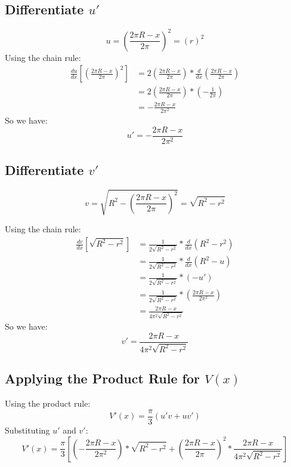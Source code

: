 \documentclass{article}
\begin{document}
\subsection{Differentiate \( u' \)}
\begin{displaymath}
    u = \left(\frac{2\pi R - x}{2\pi}\right)^2 = (r)^2
\end{displaymath}
Using the chain rule:
\begin{align*}
    \frac{du}{dx}\left[\left(\frac{2\pi R - x}{2\pi}\right)^2\right] &= 2\left(\frac{2\pi R - x}{2\pi}\right) * \frac{d}{dx}\left(\frac{2\pi R - x}{2\pi}\right) \\
    &= 2\left(\frac{2\pi R - x}{2\pi}\right) * \left(-\frac{1}{2\pi}\right) \\
    &= -\frac{2\pi R - x}{2\pi^2}
\end{align*}
So we have:
\begin{displaymath}
    u' = -\frac{2\pi R - x}{2\pi^2}
\end{displaymath}


\subsection{Differentiate \( v' \)}
\begin{displaymath}
    v = \sqrt{R^2 - \left(\frac{2\pi R - x}{2\pi}\right)^2} = \sqrt{R^2 - r^2}
\end{displaymath}

\noindent Using the chain rule:
\begin{align*}
    \frac{dv}{dx}\left[\sqrt{R^2 - r^2}\right] 
    &= \frac{1}{2 \sqrt{R^2 - r^2}} * \frac{d}{dx}\left(R^2 - r^2\right) \\
    &= \frac{1}{2 \sqrt{R^2 - r^2}} * \frac{d}{dx}\left(R^2 - u\right) \\
    &= \frac{1}{2 \sqrt{R^2 - r^2}} * \left( -u' \right) \\
    &= \frac{1}{2 \sqrt{R^2 - r^2}} * \left( \frac{2\pi R - x}{2 \pi^2} \right) \\
    &= \frac{2\pi R - x}{4\pi^2 \sqrt{R^2 - r^2}}
\end{align*}
So we have:
\begin{displaymath}
    v' = \frac{2\pi R - x}{4\pi^2 \sqrt{R^2 - r^2}}
\end{displaymath}

\subsection{Applying the Product Rule for \( V(x) \)}
Using the product rule: 
\begin{displaymath}
    V'(x) = \frac{\pi}{3}\left(u'v+uv'\right)
\end{displaymath}
Substituting \( u' \) and \( v' \):
\begin{displaymath}
    V'(x) = \frac{\pi}{3}\left[\left(-\frac{2\pi R - x}{2\pi^2}\right) * \sqrt{R^2 - r^2} + \left(\frac{2\pi R - x}{2\pi}\right)^2 * \frac{2\pi R - x}{4\pi^2\sqrt{R^2 - r^2}}\right]
\end{displaymath}
\end{document}
